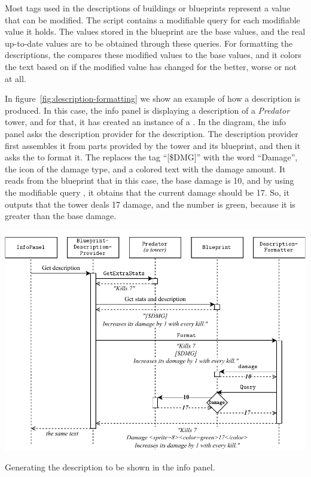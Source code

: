 Most tags used in the descriptions of buildings or blueprints represent a value that can be modified.
The  script contains a modifiable query for each modifiable value it holds.
The values stored in the blueprint are the base values, and the real up-to-date values are to be obtained through these queries.
For formatting the descriptions, the  compares these modified values to the base values, and it colors the text based on if the modified value has changed for the better, worse or not at all.

In figure~\ref{fig:description-formatting} we show an example of how a description is produced.
In this case, the info panel is displaying a description of a \emph{Predator} tower, and for that, it has created an instance of a .
In the diagram, the info panel asks the description provider for the description.
The description provider first assembles it from parts provided by the tower and its blueprint, and then it asks the  to format it.
The  replaces the tag \enquote{[\$DMG]} with the word \enquote{Damage}, the icon of the damage type, and a colored text with the damage amount.
It reads from the blueprint that in this case, the base damage is 10, and by using the modifiable query , it obtains that the current damage should be 17.
So, it outputs that the tower deals 17 damage, and the number is green, because it is greater than the base damage.

\begin{center}
    \captionsetup{type=figure}
    \includegraphics[width=\textwidth]{img/description formatting.pdf}
    \caption{Generating the description to be shown in the info panel.}
    \label{fig:description-formatting}
\end{center}

